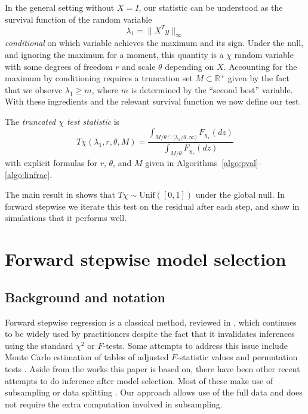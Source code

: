 \documentclass[oupdraft]{bio}
\def\real{{\mathbb R}}
\newenvironment{definition}[1][Definition]{\begin{trivlist}
\item[\hskip \labelsep {\bfseries #1}]}{\end{trivlist}}
\begin{document}
In the general setting without $X = I$, our statistic can be understood 
as the survival function of the random variable
\begin{equation}
\label{eq:lam1}
\lambda_1 = \|X^Ty\|_{\infty}
\end{equation}
{\em conditional} on which variable achieves the maximum and its sign.
Under the null, and ignoring the maximum for a moment, this quantity is
a $\chi$ random variable with some degrees of freedom $r$ and scale
$\theta$ depending on $X$. Accounting for the maximum by conditioning requires
a truncation set $M \subset \real^+$ given by the fact that we observe
$\lambda_1 \geq m$, where $m$ is determined by the ``second best'' variable.
With these ingredients and the relevant survival function we now define
our test.
\begin{definition}
The {\em truncated $\chi$ test statistic} is
\begin{equation}
\label{eq:tchi}
T\chi(\lambda_1, r, \theta,  M) = \frac{\int_{M /\theta \cap [\lambda_1/\theta,\infty)} F_{\chi_r}(dz)}{\int_{M / \theta} F_{\chi_r}(dz)}
\end{equation}
with explicit formulas for $r$, $\theta$, and $M$ given in
Algorithms~\ref{algo:pval}--\ref{algo:linfrac}.
\end{definition}

The main result in \cite{tests:adaptive} shows that
$T\chi \sim \text{Unif}([0,1])$ under the global null. In forward stepwise
we iterate this test on the residual after each step, and show in simulations
that it performs well.

\section{Forward stepwise model selection}

\subsection{Background and notation}

Forward stepwise regression is a classical method, reviewed in
\cite{classical:selection}, which continues to be widely used by
practitioners despite the fact that it invalidates inferences using
the standard $\chi^2$ or $F$-tests. Some attempts to address this
issue include Monte Carlo estimation of tables of adjusted
$F$-statistic values \citep{mc:ftoenter} and permutation tests
\citep{permutation:stop}. Aside from the works this paper is based on,
there have been other recent attempts to do inference after model
selection. Most of these make use of subsampling
\citep{meinshausen:buhlmann} or data splitting
\citep{wasserman:roeder}. Our approach allows use of the full data and
does not require the extra computation involved in subsampling.
\end{document}
